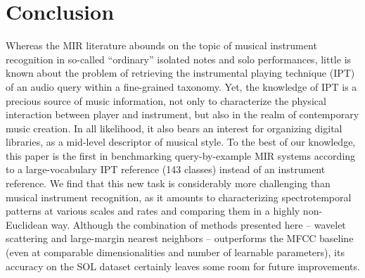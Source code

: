 \documentclass{article}
\begin{document}



\section{Conclusion}

Whereas the MIR literature abounds on the topic of musical instrument recognition in so-called ``ordinary'' isolated notes and solo performances, little is known about the problem of retrieving the instrumental playing technique (IPT) of an audio query within a fine-grained taxonomy. 
Yet, the knowledge of IPT is a precious source of music information, not only to characterize the physical interaction between player and instrument, but also in the realm of contemporary music creation.
In all likelihood, it also bears an interest for organizing digital libraries, as a mid-level descriptor of musical style.
To the best of our knowledge, this paper is the first in benchmarking query-by-example MIR systems according to a large-vocabulary IPT reference (143 classes) instead of an instrument reference.
We find that this new task is considerably more challenging than musical instrument recognition, as it amounts to characterizing spectrotemporal patterns at various scales and rates and comparing them in a highly non-Euclidean way.
Although the combination of methods presented here -- wavelet scattering and large-margin nearest neighbors -- outperforms the MFCC baseline (even at comparable dimensionalities and number of learnable parameters), its accuracy on the SOL dataset certainly leaves some room for future improvements.
\end{document}

